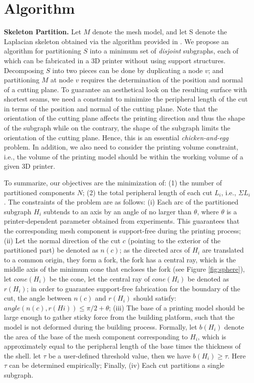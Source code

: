 \section{Algorithm}
\textbf{Skeleton Partition.} Let $M$ denote the mesh model, and let S denote the Laplacian skeleton obtained via the algorithm provided in \cite{AuTCCL08}. We propose an algorithm for partitioning $S$ into a minimum set of \emph{disjoint} subgraphs, each of which can be fabricated in a 3D printer without using support structures. Decomposing $S$ into two pieces can be done by duplicating a node $v$; and partitioning $M$ at node $v$ requires the determination of the position and normal of a cutting plane. To guarantee an aesthetical look on the resulting surface with shortest seams, we need a constraint to minimize the peripheral length of the cut in terms of the position and normal of the cutting plane. Note that the orientation of the cutting plane affects the printing direction and thus the shape of the subgraph while on the contrary, the shape of the subgraph limits the orientation of the cutting plane. Hence, this is an essential \emph{chicken-and-egg} problem. In addition, we also need to consider the printing volume constraint, i.e., the volume of the printing model should be within the working volume of a given 3{D} printer.

To summarize, our objectives are the minimization of: (1) the number of partitioned components $N$; (2) the total peripheral length of each cut $L_i$, i.e., $\Sigma L_i$. The constraints of the problem are as follows:
(i) Each arc of the partitioned subgraph $H_i$ subtends to an axis by an angle of no larger than $\theta$, where $\theta$ is a printer-dependent parameter obtained from experiments. This guarantees that the corresponding mesh component is support-free during the printing process;
(ii) Let the normal direction of the cut $c$ (pointing to the exterior of the partitioned part) be denoted as $n(c)$; as the directed arcs of $H_i$ are translated to a common origin, they form a fork, the fork has a central ray, which is the middle axis of the minimum cone that encloses the fork (see Figure \ref{fig:sphere}), let $cone(H_i)$ be the cone, let the central ray of $cone(H_i)$ be denoted as $r(H_i)$; in order to guarantee support-free fabrication for the boundary of the cut, the angle between $n(c)$ and $r(H_i)$ should satisfy: $angle(n(c), r(Hi)) \leq \pi/2 + \theta$;
(iii) The base of a printing model should be large enough to gather sticky force from the building platform, such that the model is not deformed during the building process. Formally, let $b(H_i)$ denote the area of the base of the mesh component corresponding to $H_i$, which is approximately equal to the peripheral length of the base times the thickness of the shell. let $\tau$ be a user-defined threshold value, then we have $b(H_i) \geq \tau$. Here $\tau$ can be determined empirically; Finally,
(iv) Each cut partitions a single subgraph.

